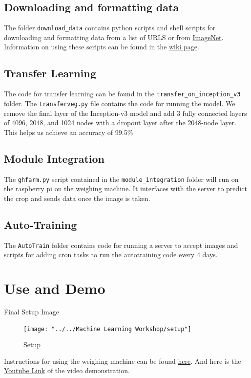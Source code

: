 \documentclass[a4paper,12pt,oneside]{book}
\begin{document}
\subsection{Downloading and formatting data}
The folder \texttt{download\_data} contains python scripts and shell scripts for downloading and formatting data from a list of URLS or from \href{http://www.image-net.org/}{ImageNet}. Information on using these scripts can be found in the \href{https://github.com/eYSIP-2017/eYSIP-2017_Vegetable-Identification-Using-Transfer-Learning/wiki/Downloading-and-formatting-data.}{wiki page}.

\subsection{Transfer Learning}
The code for transfer learning can be found in the \texttt{transfer\_on\_inception\_v3} folder. The \texttt{transferveg.py} file contains the code for running the model.
We remove the final layer of the Inception-v3 model and add 3 fully connected layers of 4096, 2048, and 1024 nodes with a dropout layer after the 2048-node layer.
This helps us achieve an accuracy of 99.5\%

\subsection{Module Integration}
The \texttt{ghfarm.py} script contained in the \texttt{module\_integration} folder will run on the raspberry pi on the weighing machine. It interfaces with the server to predict the crop and sends data once the image is taken.

\subsection{Auto-Training}
The \texttt{AutoTrain} folder contains code for running a server to accept images and scripts for adding cron tasks to run the autotraining code every 4 days.

\newpage
\section{Use and Demo}
Final Setup Image
\begin{figure}[!ht]
	\centering
	\texttt{[image: "../../Machine Learning Workshop/setup"]}
	\caption{Setup}
	\label{fig:setup}
\end{figure}


Instructions for using the weighing machine can be found \href{https://github.com/eYSIP-2017/eYSIP-2017_Vegetable-Identification-Using-Transfer-Learning/blob/master/Manual/WeighingMachineManual.pdf}{here}. And here is the \href{http://www.youtube.com}{Youtube Link} of the video demonstration.
\end{document}

